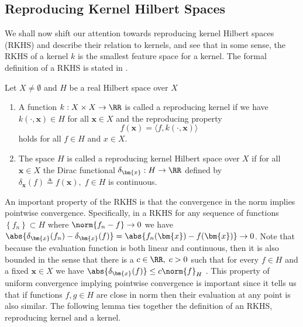 \subsection{Reproducing Kernel Hilbert Spaces}\label{Section1.2}

We shall now shift our attention towards reproducing kernel Hilbert spaces (RKHS) and describe their relation to kernels, and see that in some sense, the RKHS of a kernel $k$ is the smallest feature space for a kernel. The formal definition of a RKHS is stated in .

\begin{defe}[RKHS] \label{defe: RKHS}
    Let $X \neq \emptyset$ and $H$ be a real Hilbert space over $X$
    \begin{enumerate}
        \item A function $k : X \times X \to \RR$ is called a reproducing kernel if we have $k \left( \cdot, \bm{x} \right) \in H$ for all $\bm{x} \in X$ and the reproducing property
              \[
                  f(\bm{x}) = \langle f , k \left( \cdot, \bm{x} \right) \rangle
              \]
              holds for all $f \in H$ and $x \in X$.
        \item The space $H$ is called a reproducing kernel Hilbert space over $X$ if for all $\bm{x} \in X$ the Dirac functional $\delta_{\bm{x}} : H \to \RR$ defined by $\delta_{\bm{x}} (f) \triangleq f(\bm{x}), \; f \in H$ is continuous.
    \end{enumerate}
    \cite{SteinwartIngo2008SVMb}
\end{defe}

An important property of the RKHS is that the convergence in the norm implies pointwise convergence. Specifically, in a RKHS for any sequence of functions $\left\{ f_n \right\} \subset H$ where $\norm{f_n - f} \to 0$ we have $\abs{\delta_{\bm{x}} (f_n) - \delta_{\bm{x}} (f)} = \abs{f_n (\bm{x}) - f (\bm{x})} \to 0$. Note that because the evaluation function is both linear and continuous, then it is also bounded in the sense that there is a $c \in \RR, \; c > 0$ such that for every $f \in H$ and a fixed $\bm{x} \in X$ we have $\abs{\delta_{\bm{x}} (f)} \leq c \norm{f}_H$ \cite{BerezanskyMakarovich1996FaV1}. This property of uniform convergence implying pointwise convergence is important since it tells us that if functions $f,g \in H$ are close in norm then their evaluation at any point is also similar. The following lemma ties together the definition of an RKHS, reproducing kernel and a kernel.


